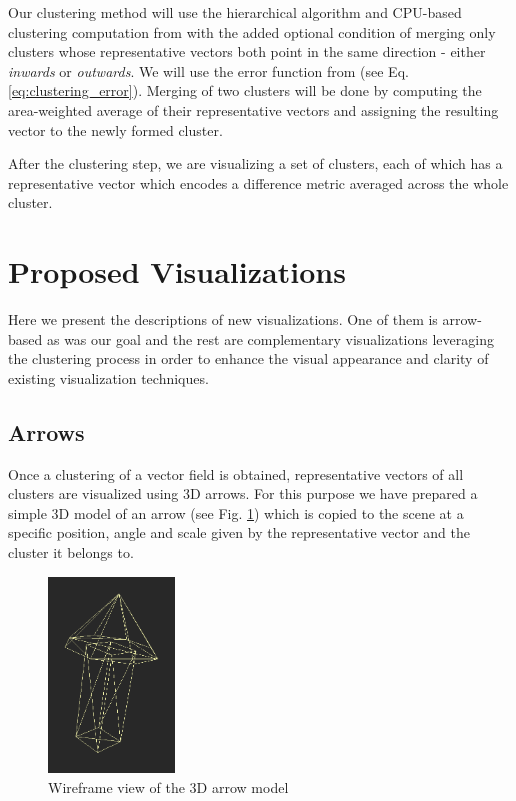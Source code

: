 Our clustering method will use the hierarchical algorithm and CPU-based clustering computation from \citet{Telea99} with the added optional condition of merging only clusters whose representative vectors both point in the same direction - either {\it inwards} or {\it outwards}. We will use the error function from \citet{Peng12} (see Eq. \ref{eq:clustering_error}). Merging of two clusters will be done by computing the area-weighted average of their representative vectors and assigning the resulting vector to the newly formed cluster.

After the clustering step, we are visualizing a set of clusters, each of which has a representative vector which encodes a difference metric averaged across the whole cluster.
\section{Proposed Visualizations}
\label{sec:analysis_visualizations}

Here we present the descriptions of new visualizations. One of them is arrow-based as was our goal and the rest are complementary visualizations leveraging the clustering process in order to enhance the visual appearance and clarity of existing visualization techniques.

\subsection{Arrows}
\label{sec:arrow_vis}

Once a clustering of a vector field is obtained, representative vectors of all clusters are visualized using 3D arrows. For this purpose we have prepared a simple 3D model of an arrow (see Fig. \ref{fig:arrow_model}) which is copied to the scene at a specific position, angle and scale given by the representative vector and the cluster it belongs to.

\begin{figure}[h]
\centering
\includegraphics[width=0.3\textwidth]{./img/8sided_arrow.PNG}
\caption[Arrow Model]{Wireframe view of the 3D arrow model}
\label{fig:arrow_model}
\end{figure}

